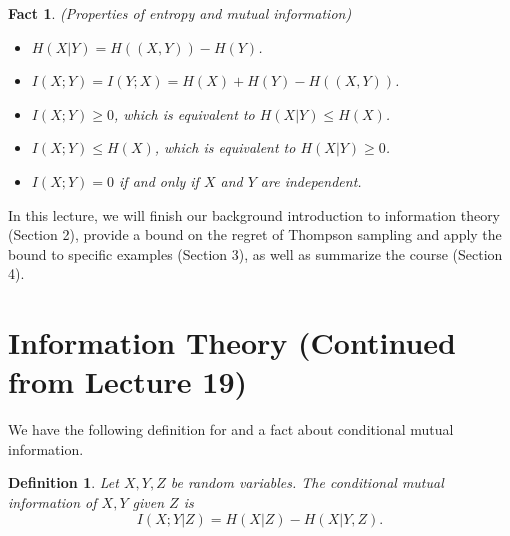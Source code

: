 \documentclass[11pt]{article}
\newtheorem{definition}{Definition}[section]
\newtheorem{fact}{Fact}
\begin{document}
\begin{fact}\label{props}
(Properties of entropy and mutual information)
\begin{itemize}
    \item $H(X|Y) = H((X, Y)) - H(Y)$.
    
    \item $I(X;Y) = I(Y;X) = H(X) + H(Y) - H((X, Y))$.
    
    \item $I(X;Y) \ge 0$, which is equivalent to $H(X|Y) \le H(X)$.
    
    \item $I(X;Y) \le H(X)$, which is equivalent to $H(X|Y) \ge 0$.
    
    \item $I(X;Y) = 0$ if and only if $X$ and $Y$ are independent.
\end{itemize}
\end{fact}

In this lecture, we will finish our background introduction to information theory (Section 2), provide a bound on the regret of Thompson sampling and apply the bound to specific examples (Section 3), as well as summarize the course (Section 4).

\section{Information Theory (Continued from Lecture 19)}

We have the following definition for and a fact about conditional mutual information.
\begin{definition}\label{cond_mi}
Let $X,Y,Z$ be random variables. The conditional mutual information of $X,Y$ given $Z$ is
\begin{equation*}
    I(X;Y|Z) = H(X|Z) - H(X|Y,Z).
\end{equation*}
\end{definition}
\end{document}
